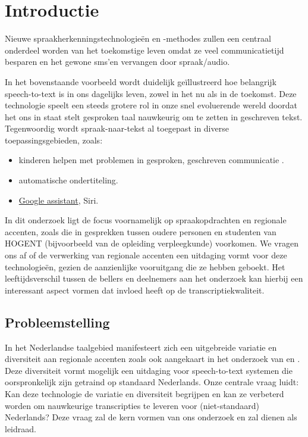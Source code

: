 \section{Introductie}%
\label{sec:introductie}
\epigraph{Nieuwe spraakherkenningstechnologieën en -methodes zullen een centraal onderdeel worden van het toekomstige leven omdat ze veel communicatietijd besparen en het gewone sms'en vervangen door spraak/audio.}{\cite{Shakhovska2019a}}

In het bovenstaande voorbeeld wordt duidelijk geïllustreerd hoe belangrijk speech-to-text is in ons dagelijks leven, zowel in het nu als in de toekomst. Deze technologie speelt een steeds grotere rol in onze snel evoluerende wereld doordat het ons in staat stelt gesproken taal nauwkeurig om te zetten in geschreven tekst. Tegenwoordig wordt spraak-naar-tekst al  toegepast in diverse toepassingsgebieden, zoals:
\begin{itemize}
    \item kinderen helpen met problemen in gesproken, geschreven communicatie \autocite{Kambouri2023}.
    \item automatische ondertiteling.
    \item \href{https://assistant.google.com/}{Google assistant}, Siri.  
\end{itemize}

In dit onderzoek ligt de focus voornamelijk op spraakopdrachten en regionale accenten, zoals die in gesprekken tussen oudere personen en studenten van HOGENT (bijvoorbeeld van de opleiding verpleegkunde) voorkomen. We vragen ons af of de verwerking van regionale accenten een uitdaging vormt voor deze technologieën, gezien de aanzienlijke vooruitgang die ze hebben geboekt. Het leeftijdsverschil tussen de bellers en deelnemers aan het onderzoek kan hierbij een interessant aspect vormen dat invloed heeft op de transcriptiekwaliteit.

\subsection{Probleemstelling}
In het Nederlandse taalgebied manifesteert zich een uitgebreide variatie en diversiteit aan regionale accenten zoals ook aangekaart in het onderzoek van \autocite{ghyselen2020clearing} en \autocite{barbiers2004reflexieven}. Deze diversiteit vormt mogelijk een uitdaging voor speech-to-text systemen die oorspronkelijk zijn getraind op standaard Nederlands. 
Onze centrale vraag luidt: Kan deze technologie de variatie en diversiteit begrijpen en kan ze verbeterd worden om nauwkeurige transcripties te leveren voor (niet-standaard) Nederlands? Deze vraag zal de kern vormen van ons onderzoek en zal dienen als leidraad.

